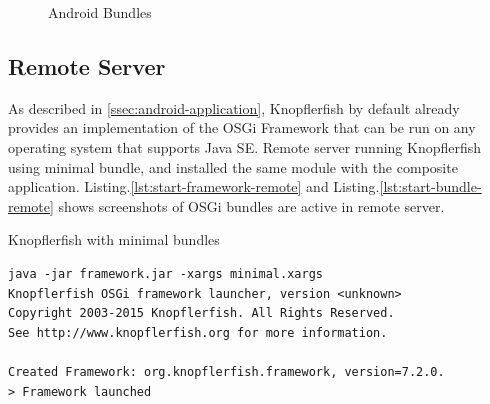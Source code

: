 \documentclass[conference]{IEEEtran}
\begin{document}
\begin{figure}
{		\label{fig:android-bundle-5}}
	\hfil
	\caption{Android Bundles}
	\label{fig:android-bundle}
\end{figure}




\subsection{Remote Server}
As described in \ref{ssec:android-application}, Knopflerfish by default already provides an implementation of the OSGi Framework that can be run on any operating system that supports Java SE. Remote server running Knopflerfish using minimal bundle, and installed the same module with the composite application. Listing.\ref{lst:start-framework-remote} and Listing.\ref{lst:start-bundle-remote} shows screenshots of OSGi bundles are active in remote server.

\begin{listing}
    \caption{Knopflerfish with minimal bundles}
    \begin{verbatim}
java -jar framework.jar -xargs minimal.xargs
Knopflerfish OSGi framework launcher, version <unknown>
Copyright 2003-2015 Knopflerfish. All Rights Reserved.
See http://www.knopflerfish.org for more information.

Created Framework: org.knopflerfish.framework, version=7.2.0.
> Framework launched
	\end{verbatim}
    \label{lst:start-framework-remote}
\end{listing}
\end{document}
